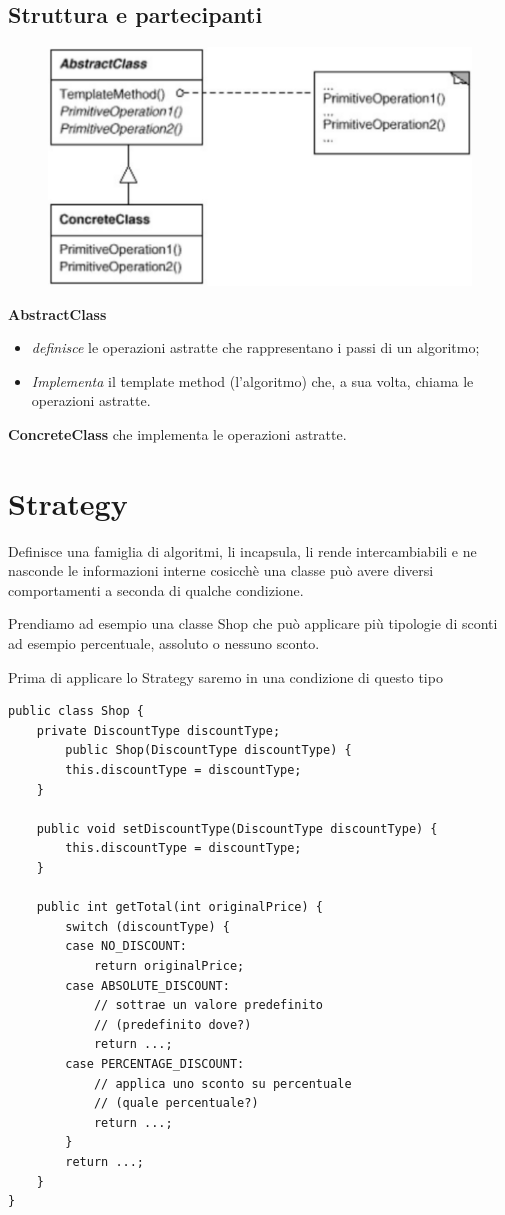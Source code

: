 \subsection{Struttura e partecipanti}

\begin{figure}[H]
    \centering
    \includegraphics[width=0.4\linewidth]{../../immagini/templateMethod_Strategy/struttura_templateMethod}    
\end{figure}

\textbf{AbstractClass} 

\begin{itemize}
    \item \textit{definisce} le operazioni astratte che rappresentano i passi di un algoritmo;
    \item \textit{Implementa} il template method (l’algoritmo) che, a sua volta, chiama le operazioni astratte.
\end{itemize}

\textbf{ConcreteClass} che implementa le operazioni astratte.

\section{Strategy}

Definisce una famiglia di algoritmi, li incapsula, li rende intercambiabili e ne nasconde le informazioni interne cosicchè una classe può avere diversi comportamenti 
a seconda di qualche condizione.
\smallskip

Prendiamo ad esempio una classe Shop che può applicare più tipologie di sconti ad esempio percentuale, assoluto o nessuno sconto.

Prima di applicare lo Strategy saremo in una condizione di questo tipo
\begin{lstlisting}
public class Shop {
    private DiscountType discountType;
        public Shop(DiscountType discountType) {
        this.discountType = discountType;
    }

    public void setDiscountType(DiscountType discountType) {
        this.discountType = discountType;
    }

    public int getTotal(int originalPrice) {
        switch (discountType) {
        case NO_DISCOUNT:
            return originalPrice;
        case ABSOLUTE_DISCOUNT:
            // sottrae un valore predefinito
            // (predefinito dove?)
            return ...;
        case PERCENTAGE_DISCOUNT:
            // applica uno sconto su percentuale
            // (quale percentuale?)
            return ...;
        }
        return ...;
    }
}
\end{lstlisting}

